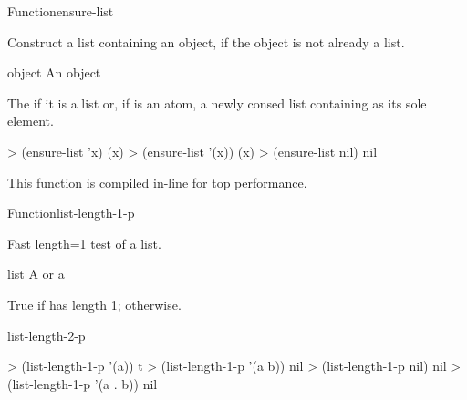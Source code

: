 \documentclass[10pt,twoside,english,pdftex]{article}
\newcommand{\inline}{This function is compiled in-line for top performance.}
\begin{document}

\begin{functiondoc}{Function}{ensure-list}{ \returns{}
    }
%

\fnsyntax

\fnpurpose Construct a list containing an object, if the object is not
already a list.

\fnpackage {}

\fnmodule {}

\fnargs
\begin{args}{object}
\arg[object] An object
\end{args}

\fnreturns The  if it is a list or, if  is
an atom, a newly consed list containing  as its sole element.
  
\fnexamples
\begin{example}
> (ensure-list 'x)
(x)
> (ensure-list '(x))
(x)
> (ensure-list nil)
nil
\end{example}

\fnnotes \inline

\end{functiondoc}


\begin{functiondoc}{Function}{list-length-1-p}%
  { \returns{} }
%
%

\fnsyntax

\fnpurpose Fast length=1 test of a list.

\fnpackage {}

\fnmodule {}

\fnargs
\begin{args}{list}
\arg[list] A  or a 
\end{args}

\fnreturns True if  has length 1; \nil{} otherwise.

\begin{alsos}{list-length-2-p}
\end{alsos}

\fnexamples
\begin{example}
> (list-length-1-p '(a))
t
> (list-length-1-p '(a b))
nil
> (list-length-1-p nil)
nil
> (list-length-1-p '(a . b))
nil
\end{example}

\end{functiondoc}
\end{document}
